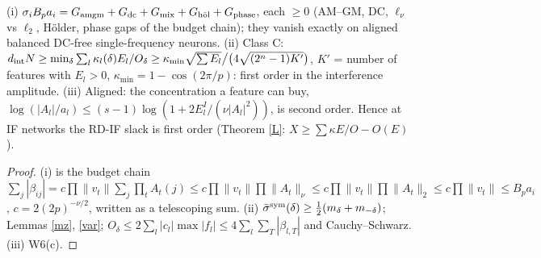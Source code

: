 \documentclass[11pt]{article}
\theoremstyle{remark}\newtheorem{remark}[theorem]{Remark}
\begin{document}
\begin{proposition}\label{O} (i) $\sigma_i B_pa_i=G_{\rm amgm}+G_{\rm dc}+G_{\rm mix}+G_{\rm h\ddot ol}+G_{\rm phase}$, each $\ge0$
(AM--GM, DC, $\ell_\nu$ vs $\ell_2$, H\"older, phase gaps of the budget chain); they vanish exactly on aligned balanced DC-free single-frequency neurons.
(ii) Class C: $d_{\rm int}N\ge\min_\delta\sum_l\kappa_l(\delta)E_l/O_\delta\ge\kappa_{\min}\sqrt{\sum E_l}\big/\big(4\sqrt{(2^n-1)K'}\big)$, $K'$ = number of features with
$E_l>0$, $\kappa_{\min}=1-\cos(2\pi/p)$: first order in the interference amplitude. (iii) Aligned: the concentration a feature can buy,
$\log(|A_l|/a_l)\le(s-1)\log(1+2E^I_l/(\nu|A_l|^2))$, is second order. Hence at IF networks the RD-IF slack is first order (Theorem \ref{L}: $X\ge
\sum\kappa E/O-O(E)$).\end{proposition}
\begin{proof} (i) is the budget chain $\sum_j|\beta_{ij}|=c\prod\|v_t\|\sum_j\prod_tA_t(j)\le c\prod\|v_t\|\prod\|A_t\|_\nu\le c\prod\|v_t\|\prod\|A_t\|_2\le c\prod\|v_t\|\le B_pa_i$,
$c=2(2p)^{-\nu/2}$, written as a telescoping sum. (ii) $\bar\sigma^{\rm sym}(\delta)\ge\tfrac12(m_\delta+m_{-\delta})$; Lemmas \ref{mz}, \ref{var};
$O_\delta\le 2\sum_l|c_l|\max|f_l|\le4\sum_l\sum_T|\beta_{l,T}|$ and Cauchy--Schwarz. (iii) W6(c).\end{proof}
\end{document}
